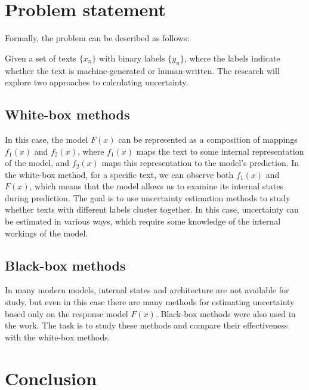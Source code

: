\documentclass[a4paper, 12pt]{article}
\begin{document}
\section{Problem statement}

Formally, the problem can be described as follows:  

Given a set of texts \(\{x_n\}\) with binary labels \(\{y_n\}\), where the labels indicate whether the text is machine-generated or human-written. The research will explore two approaches to calculating uncertainty.

\subsection {White-box methods}  
In this case, the model \(F(x)\) can be represented as a composition of mappings \(f_1(x)\) and \(f_2(x)\), where \(f_1(x)\) maps the text to some internal representation of the model, and \(f_2(x)\) maps this representation to the model's prediction. In the white-box method, for a specific text, we can observe both \(f_1(x)\) and \(F(x)\), which means that the model allows us to examine its internal states during prediction. The goal is to use uncertainty estimation methods to study whether texts with different labels cluster together. In this case, uncertainty can be estimated in various ways\citep{Polygraph}, which require some knowledge of the internal workings of the model.  

\subsection {Black-box methods}   
In many modern models, internal states and architecture are not available for study, but even in this case there are many methods for estimating uncertainty based only on the response model \(F(x)\). Black-box methods were also used in the work\citep{Polygraph}. The task is to study these methods and compare their effectiveness with the white-box methods.

\section{Conclusion}



\end{document}
